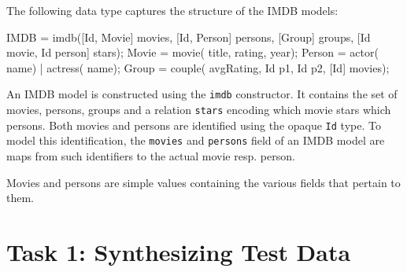 \documentclass[submission,copyright,creativecommons]{eptcs}
\begin{document}
The following data type captures the structure of the IMDB models:
\begin{rascal}
 IMDB   = imdb([Id, Movie] movies, [Id, Person] persons, 
                   [Group] groups, [Id movie, Id person] stars);
 Movie  = movie( title,  rating,  year);
 Person = actor( name) | actress( name);
 Group  = couple( avgRating, Id p1, Id p2, [Id] movies);
\end{rascal}

An IMDB model is constructed using the \texttt{imdb} constructor. It contains the set of movies, persons, groups and a relation \texttt{stars} encoding which movie stars which persons. 
Both movies and persons are identified using the opaque \texttt{Id} type. 
To model this identification, the \texttt{movies} and \texttt{persons} field of an IMDB model are maps from such identifiers to the actual movie resp. person. 

Movies and persons are simple values containing the various fields that pertain to them. 



\section{Task 1: Synthesizing Test Data}
\end{document}
